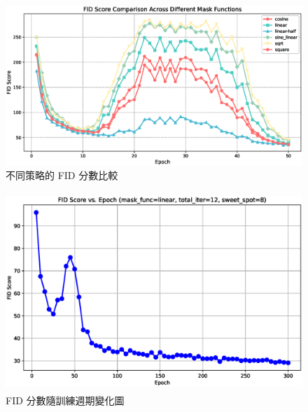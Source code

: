 \begin{figure}[h]
    \centering
    \includegraphics[width=\textwidth]{figures/fid_comparison.eps}
    \caption{不同策略的 FID 分數比較}
    \label{fig:fid_comparison}
\end{figure}



\clearpage
\begin{figure}[h]
    \centering
    \includegraphics[height=7.5cm]{figures/fid_vs_epoch.eps}
    \caption{FID 分數隨訓練週期變化圖}
    \label{fig:fid_vs_epoch}
\end{figure}






